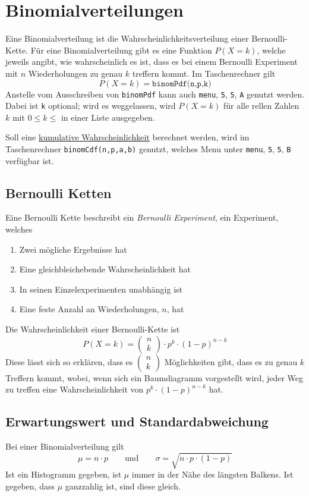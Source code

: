 \documentclass{article}
\begin{document}
\section{Binomialverteilungen}
Eine Binomialverteilung ist die Wahrscheinlichkeitsverteilung einer Bernoulli-Kette. Für eine Binomialverteilung gibt es eine Funktion $P(X=k)$, welche jeweils angibt, wie wahrscheinlich es ist, dass es bei einem Bernoulli Experiment mit $n$ Wiederholungen zu genau $k$ treffern kommt. Im Taschenrechner gilt 
\[
 P(X=k)=\texttt{binomPdf(n,p,k)}
\]
Anstelle vom Ausschreiben von \texttt{binomPdf} kann auch \texttt{menu}, \texttt{5}, \texttt{5}, \texttt{A} genutzt werden. Dabei ist \texttt{k} optional; wird es weggelassen, wird $P(X=k)$ für alle rellen Zahlen $k$ mit $0 \leq k \leq$ in einer Liste ausgegeben.
 
Soll eine \hyperref[Kumulative Wahrscheinlichkeiten]{kumulative Wahrscheinlichkeit} berechnet werden, wird im Taschenrechner \texttt{binomCdf(n,p,a,b)} genutzt, welches Menu unter \texttt{menu}, \texttt{5}, \texttt{5}, \texttt{B} verfügbar ist.
 
\subsection{Bernoulli Ketten}
Eine Bernoulli Kette beschreibt ein \emph{Bernoulli Experiment}, ein Experiment, welches
\begin{enumerate}
 \item Zwei mögliche Ergebnisse hat
 \item Eine gleichbleichebende Wahrscheinlichkeit hat
 \item In seinen Einzelexperimenten unabhängig ist
 \item Eine feste Anzahl an Wiederholungen, $n$, hat 
\end{enumerate} 
Die Wahrscheinlichkeit einer Bernoulli-Kette ist
\[
 P(X=k) =
 \begin{pmatrix} n \\ k \end{pmatrix} \cdot
 p^k \cdot (1-p)^{n-k}
\]
Diese lässt sich so erklären, dass es $\begin{pmatrix} n \\ k \end{pmatrix}$ Möglichkeiten gibt, dass es zu genau $k$ Treffern kommt, wobei, wenn sich ein Baumdiagramm vorgestellt wird, jeder Weg zu treffen eine Wahrscheinlichkeit von $p^k \cdot (1-p)^{n-k}$ hat.
 
\subsection{Erwartungswert und Standardabweichung}
Bei einer Binomialverteilung gilt
\[
 \mu = n \cdot p 
 \qquad \text{und} \qquad
 \sigma = \sqrt{n \cdot p \cdot (1-p)} 
\]
Ist ein Histogramm gegeben, ist $\mu$ immer in der Nähe des längsten Balkens. Ist gegeben, dass $\mu$ ganzzahlig ist, sind diese gleich.
\end{document}
